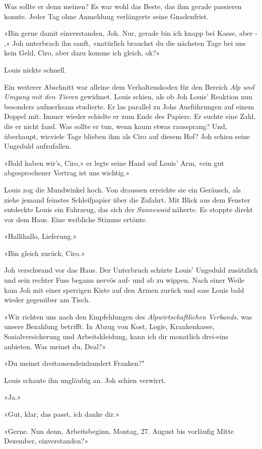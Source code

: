 Was sollte er denn meinen? Es war wohl das Beste, das ihm gerade passieren konnte. Jeder Tag ohne Anmeldung verlängerte seine Gnadenfrist.

«Bin gerne damit einverstanden, Joh. Nur, gerade bin ich knapp bei Kasse, aber - ,» Joh unterbrach ihn sanft, «natürlich brauchst du die nächsten Tage bei uns kein Geld, Ciro, aber dazu komme ich gleich, ok?»

Louis nickte schnell.

Ein weiterer Abschnitt war alleine dem Verhaltenskodex für den Bereich \emph{Alp und Umgang mit den Tieren}
gewidmet. Louis schien, als ob Joh Louis’ Reaktion nun besonders
aufmerksam studierte.
Er las parallel zu Johs Ausführungen auf einem Doppel mit. Immer
wieder schielte er zum Ende des Papiers. Er suchte eine Zahl, die er
nicht fand. Was sollte er tun, wenn kaum etwas raussprang? Und, überhaupt, wieviele Tage blieben ihm als Ciro auf diesem Hof? Joh schien seine Ungeduld aufzufallen.

«Bald haben wir’s, Ciro,» er legte seine Hand auf Louis’ Arm, «ein gut
abgesprochener Vertrag ist uns wichtig.»

Louis zog die Mundwinkel hoch. Von draussen erreichte sie ein Geräusch, als ziehe jemand feinstes
Schleifpapier über die Zufahrt. Mit Blick aus dem Fenster entdeckte
Louis ein Fahrzeug, das sich der \emph{Sunnewaid} näherte. Es stoppte
direkt vor dem Haus.
Eine weibliche Stimme ertönte.

«Hallihallo, Lieferung.»

«Bin gleich zurück, Ciro.»

Joh verschwand vor das Haus. Der Unterbruch schürte Louis’ Ungeduld zusätzlich und sein rechter Fuss begann nervös auf- und ab zu wippen. Nach einer Weile kam Joh mit einer sperrigen
Kiste auf den Armen zurück und sass Louis bald wieder gegenüber am Tisch.

«Wir richten uns nach den Empfehlungen des \emph{Alpwirtschaftlichen
Verbands,} was unsere Bezahlung betrifft. In Abzug von Kost, Logie,
Krankenkasse, Sozialversicherung und Arbeitskleidung, kann ich dir monatlich drei-eins anbieten. Was meinst du, Deal?»

«Du meinst dreitausendeinhundert Franken?"

Louis schaute ihn ungläubig an. Joh schien verwirrt.

«Ja.»

«Gut, klar, das passt, ich danke dir.»

«Gerne. Nun denn, Arbeitsbeginn, Montag, 27. August bis vorläufig Mitte Dezember, einverstanden?»

